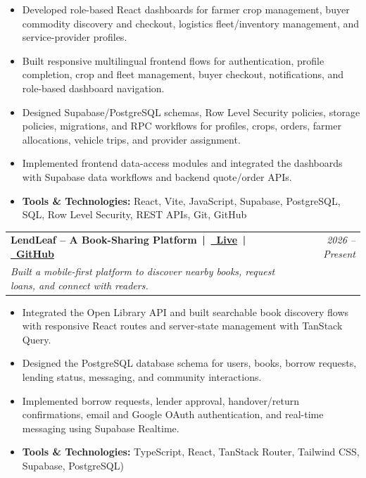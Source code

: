 \documentclass[a4paper,11pt]{article}
\makeatletter
\newcommand{\resumeProject}[4]{
\vspace{0.5mm}\item
    \begin{tabular*}{0.98\textwidth}[t]{l@{\extracolsep{\fill}}r}
        \textbf{#1} & \textit{\footnotesize{#3}} \\
        \footnotesize{\textit{#2}} & \footnotesize{#4}
    \end{tabular*}
    \vspace{-2.4mm}
}
\newcommand{\resumeItemListStart}{\begin{justify}\begin{itemize}[leftmargin=3ex, rightmargin=2ex, noitemsep,labelsep=1.2mm,itemsep=0mm]\small}
\newcommand{\resumeItemListEnd}{\end{itemize}\end{justify}\vspace{-2mm}}
\makeatother
\begin{document}
      \resumeItemListStart
      \vspace{-2mm}
        \item{Developed role-based React dashboards for farmer crop management, buyer commodity discovery and checkout, logistics fleet/inventory management, and service-provider profiles.}
        \item{Built responsive multilingual frontend flows for authentication, profile completion, crop and fleet management, buyer checkout, notifications, and role-based dashboard navigation.}
        \item{Designed Supabase/PostgreSQL schemas, Row Level Security policies, storage policies, migrations, and RPC workflows for profiles, crops, orders, farmer allocations, vehicle trips, and provider assignment.}
        \item{Implemented frontend data-access modules and integrated the dashboards with Supabase data workflows and backend quote/order APIs.}
        \item{\textbf{Tools \& Technologies:} React, Vite, JavaScript, Supabase, PostgreSQL, SQL, Row Level Security, REST APIs, Git, GitHub}
    \resumeItemListEnd
    \vspace{-2mm}

\resumeProject
  {LendLeaf -- A Book-Sharing Platform \,|\, \href{https://lendit.vijaykumarbamini.workers.dev/}{\faGlobe\ Live} \,|\, \href{https://github.com/vijaybamini/lendleaf}{\faGithub\ GitHub}}
  {Built a mobile-first platform to discover nearby books, request loans, and connect with readers.}
  {2026 -- Present}
  {}
      \resumeItemListStart
      \vspace{-2mm}
        \item{Integrated the Open Library API and built searchable book discovery flows with responsive React routes and server-state management with TanStack Query.}
        \item{Designed the PostgreSQL database schema for users, books, borrow requests, lending status, messaging, and community interactions.}
        \item{Implemented borrow requests, lender approval, handover/return confirmations, email and Google OAuth authentication, and real-time messaging using Supabase Realtime.}
        \item{\textbf{Tools \& Technologies:} TypeScript, React, TanStack Router, Tailwind CSS, Supabase, PostgreSQL)}
    \resumeItemListEnd
    \vspace{-2mm}
    
\end{document}
